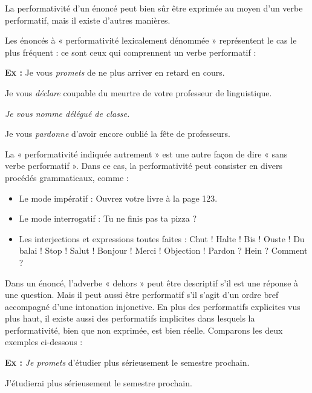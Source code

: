La performativité d’un énoncé peut bien sûr être exprimée au moyen d’un verbe performatif, mais il existe d’autres manières.

Les énoncés à « performativité lexicalement dénommée » représentent le cas le plus fréquent : ce sont ceux qui comprennent un verbe performatif :

\textbf{Ex :} Je vous \textit{promets} de ne plus arriver en retard en cours.

\hspace*{1.5em}Je vous \textit{déclare} coupable du meurtre de votre professeur de linguistique.

\hspace*{1.5em}\textit{Je vous nomme délégué de classe.}

\hspace*{1.5em}Je vous \textit{pardonne} d’avoir encore oublié la fête de professeurs.

La « performativité indiquée autrement » est une autre façon de dire « sans verbe performatif ». Dans ce cas, la performativité peut consister en divers procédés grammaticaux, comme :
\begin{itemize}
\item Le mode impératif : Ouvrez votre livre à la page 123.
\item Le mode interrogatif : Tu ne finis pas ta pizza ?
\item Les interjections et expressions toutes faites : Chut ! Halte ! Bis ! Ouste ! Du balai ! Stop ! Salut ! Bonjour ! Merci ! Objection ! Pardon ? Hein ? Comment ?
\end{itemize}

Dans un énoncé, l’adverbe « dehors » peut être descriptif s’il est une réponse à une question. Mais il peut aussi être performatif s’il s’agit d’un ordre bref accompagné d’une intonation injonctive. En plus des performatifs explicites vus plus haut, il existe aussi des performatifs implicites dans lesquels la performativité, bien que non exprimée, est bien réelle. Comparons les deux exemples ci-dessous :

\textbf{Ex :} \textit{Je promets} d’étudier plus sérieusement le semestre prochain.

\hspace*{1.5em}J’étudierai plus sérieusement le semestre prochain.

